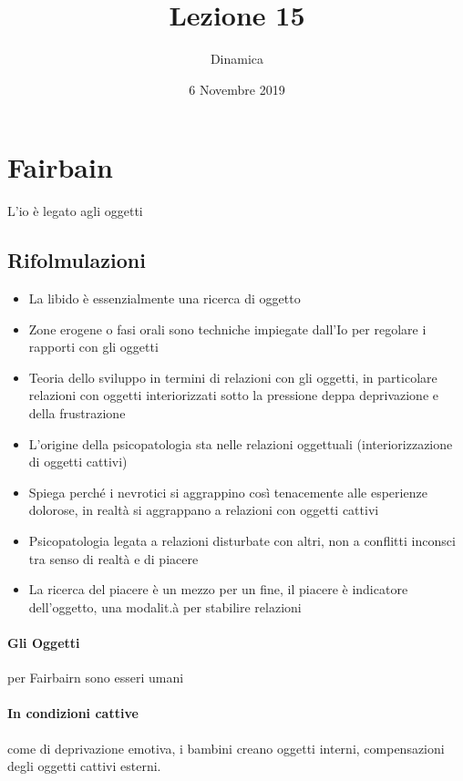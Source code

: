 \documentclass[12pt, a4paper]{article}
\date{6 Novembre 2019}
\title{Lezione 15}
\author{Dinamica}
\begin{document}
\maketitle

\section{Fairbain}

L'io è legato agli oggetti

\subsection{Rifolmulazioni}

\begin{itemize}

    \item La libido \`e essenzialmente una ricerca di oggetto
    \item Zone erogene o fasi orali sono techniche impiegate dall'Io per regolare i rapporti con gli oggetti
    \item Teoria dello sviluppo in termini di relazioni con gli oggetti, in particolare relazioni con oggetti interiorizzati sotto la pressione deppa deprivazione e della frustrazione
    \item L'origine della psicopatologia sta nelle relazioni oggettuali (interiorizzazione di oggetti cattivi)
    \item Spiega perch\'e i nevrotici si aggrappino cos\`i tenacemente alle esperienze dolorose, in realt\`a si aggrappano a relazioni con oggetti cattivi
    \item Psicopatologia legata a relazioni disturbate con altri, non a conflitti inconsci tra senso di realt\`a e di piacere
    \item La ricerca del piacere \`e un mezzo per un fine, il piacere \`e indicatore dell'oggetto, una modalit.\`a per stabilire relazioni
\end{itemize}

\paragraph{Gli Oggetti} per Fairbairn sono esseri umani

\paragraph{In condizioni cattive} come di deprivazione emotiva, i bambini creano oggetti interni, compensazioni degli oggetti cattivi esterni.
\end{document}

